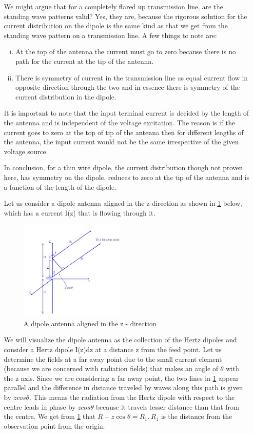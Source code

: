 We might argue that for a completely flared up transmission line, are the standing wave patterns valid? Yes, they are, because the rigorous solution for the current distribution on the dipole is the same kind as that we get from the standing wave pattern on a transmission line. A few things to note are:
\begin{enumerate}[(i)]
\item  At the top of the antenna the current must go to zero because there is no path for the current at the tip of the antenna.
\item  There is symmetry of current in the transmission line as equal current flow in opposite direction through the two and in essence there is symmetry of the current distribution in the dipole. 
\end{enumerate}

It is important to note that the input terminal current is decided by the length of the antenna and is independent of the voltage excitation. The reason is if the current goes to zero at the top of tip of the antenna then for different lengths of the antenna, the input current would not be the same irrespective of the given voltage source.

In conclusion, for a thin wire dipole, the current distribution though not proven here, has symmetry on the dipole, reduces to zero at the tip of the antenna and is a function of the length of the dipole.

Let us consider a dipole antenna aligned in the z direction as shown in \ref{figure3} below, which has a current I(z) that is flowing through it. 
\begin{figure}[h]
\centering
\includegraphics[height=5cm]{./graphics/diagram7}
\caption{A dipole antenna aligned in the z - direction}
\label{figure3}
\end{figure}

We will visualize the dipole antenna as the collection of the Hertz dipoles and consider a Hertz dipole I(z)dz at a distance z from the feed point. Let us determine the fields at a far away point due to the small current element (because we are concerned with radiation fields) that makes an angle of $\theta$ with the z axis. Since we are considering a far away point, the two lines in \ref{figure3} appear parallel and the difference in distance traveled by waves along this path is given by $zcos\theta$. This means the radiation from the Hertz dipole with respect to the centre leads in phase by $zcos\theta$ because it travels lesser distance than that from the centre. We get from \ref{figure3} that $R - z\cos\theta = R_1. \ R_1$ is the distance from the observation point from the origin. 

